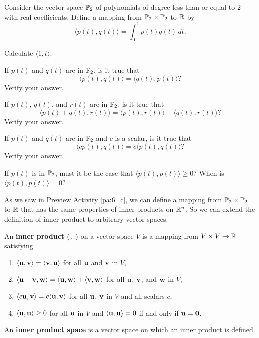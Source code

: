 \begin{pa} \label{pa:6_c} Consider the vector space $\mathbb{P}_2$ of polynomials of degree less than or equal to $2$ with real coefficients. Define a mapping from $\mathbb{P}_2 \times \mathbb{P}_2$ to $\mathbb{R}$ by
\[\langle p(t), q(t) \rangle = \int_0^1 p(t)q(t) \, dt.\]
 
\be
\item Calculate $\langle 1, t \rangle$. 
	
\item If $p(t)$ and $q(t)$ are in $\mathbb{P}_2$, is it true that 
	\[ \langle p(t) , q(t) \rangle = \langle q(t), p(t) \rangle?\]
	Verify your answer.
	
\item If $p(t)$, $q(t)$, and $r(t)$ are in $\mathbb{P}_2$, is it true that 
	\[\langle p(t)+q(t), r(t) \rangle = \langle p(t), r(t) \rangle + \langle q(t), r(t) \rangle?\]
	Verify your answer.
	
\item If $p(t)$ and $q(t)$ are in $\mathbb{P}_2$ and $c$ is a scalar, is it true that 
\[\langle cp(t) , q(t) \rangle = c\langle p(t) , q(t) \rangle?\]
Verify your answer. 

\item If $p(t)$ is in $\mathbb{P}_2$, must it be the case that $\langle p(t) , p(t) \rangle \geq 0$? When is $\langle p(t) , p(t) \rangle = 0$?
 
\ee

\end{pa}

 
\label{sec:inner_prod_spaces}

As we saw in Preview Activity \ref{pa:6_c}, we can define a mapping from $\mathbb{P}_2 \times \mathbb{P}_2$ to $\mathbb{R}$ that has the same properties of inner products on $\mathbb{R}^n$. So we can extend the definition of inner product to arbitrary vector spaces.  

\begin{definition} \label{def:6_c_inner_product}  An \textbf{inner product} $\langle \ , \ \rangle$ on a vector space $V$ is a mapping from $V \times V \to \mathbb{R}$ satisfying
\begin{enumerate}
\item $\langle \mathbf{u} , \mathbf{v} \rangle = \langle \mathbf{v} , \mathbf{u} \rangle$ for all $\mathbf{u}$ and $\mathbf{v}$ in $V$,
\item $\langle \mathbf{u} + \mathbf{v} , \mathbf{w} \rangle = \langle \mathbf{u} , \mathbf{w} \rangle + \langle \mathbf{v} , \mathbf{w} \rangle$ for all $\mathbf{u}$, $\mathbf{v}$, and $\mathbf{w}$ in $V$,
\item $\langle c\mathbf{u} , \mathbf{v} \rangle = c\langle \mathbf{u} , \mathbf{v} \rangle$ for all $\mathbf{u}$, $\mathbf{v}$ in $V$ and all scalars $c$,
\item $\langle \mathbf{u} , \mathbf{u} \rangle \geq 0$ for all $\mathbf{u}$ in $V$ and $\langle \mathbf{u} , \mathbf{u} \rangle = 0$ if and only if $\mathbf{u} = \mathbf{0}$.
\end{enumerate}
An \textbf{inner product space} is a vector space on which an inner product is defined.
\end{definition} 

